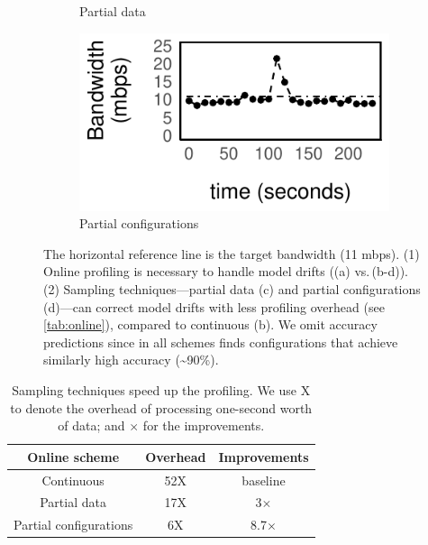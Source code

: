\begin{figure}
\begin{subfigure}[t]{0.49\columnwidth}
    \caption{Partial data}
    \label{fig:online-partial}
  \end{subfigure}
  \hfill
  \begin{subfigure}[t]{0.49\columnwidth}
    \includegraphics[width=\textwidth]{figures/online4.pdf}
    \caption{Partial configurations}
    \label{fig:online-trigger}
  \end{subfigure}
  \caption{The horizontal reference line is the target bandwidth (11 mbps). (1)
    Online profiling is necessary to handle model drifts ((a) vs.\,(b-d)). (2)
    Sampling techniques---partial data (c) and partial configurations (d)---can
    correct model drifts with less profiling overhead (see
    \autoref{tab:online}), compared to continuous (b).  We omit accuracy
    predictions since in all schemes \sysname{} finds configurations that
    achieve similarly high accuracy (\textasciitilde 90\%).  }
  \label{fig:online-tricks}
\end{figure}


\begin{table}[t]
  \centering
  \begin{tabular}{c c c}
    \toprule
    Online scheme & Overhead & Improvements \\
    \midrule
    Continuous & 52X & baseline \\
    Partial data & 17X & 3$\times$\\
    Partial configurations & 6X & 8.7$\times$ \\
    \bottomrule
  \end{tabular}
  \caption{Sampling techniques speed up the profiling. We use X to denote the
    overhead of processing one-second worth of data; and $\times$ for the
    improvements.}
  \label{tab:online}
\end{table}

